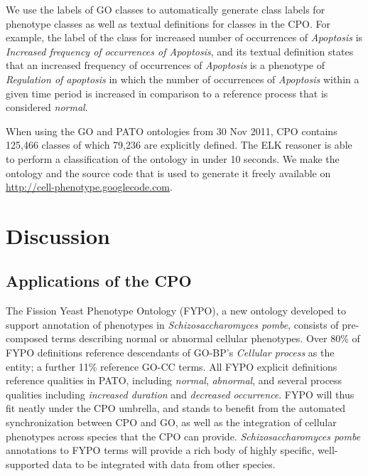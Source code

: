 \documentclass{bioinfo}
\renewcommand{\cite}{\citep}
\begin{document}
We use the labels of GO classes to automatically generate class labels
for phenotype classes as well as textual definitions for classes in
the CPO. For example, the label of the class for increased number of
occurrences of {\em Apoptosis} is {\em Increased frequency of
  occurrences of Apoptosis}, and its textual definition states that an
increased frequency of occurrences of {\em Apoptosis} is a phenotype
of {\em Regulation of apoptosis} in which the number of occurrences of
{\em Apoptosis} within a given time period is increased in comparison
to a reference process that is considered {\em normal}.

When using the GO and PATO ontologies from 30 Nov 2011, CPO contains
125,466 classes of which 79,236 are explicitly defined.  The ELK
reasoner \cite{Kazakov2011} is able to perform a classification of the
ontology in under 10 seconds. We make the ontology and the source code
that is used to generate it freely available on
\url{http://cell-phenotype.googlecode.com}.

\section{Discussion}

\subsection{Applications of the CPO}
The Fission Yeast Phenotype Ontology (FYPO), a new ontology developed
to support annotation of phenotypes in {\em Schizosaccharomyces
  pombe}, consists of pre-composed terms describing normal or abnormal
cellular phenotypes. Over 80\% of FYPO definitions reference
descendants of GO-BP's {\em Cellular process} as the entity; a further
11\% reference GO-CC terms. All FYPO explicit definitions reference
qualities in PATO, including {\em normal}, {\em abnormal}, and several
process qualities including {\em increased duration} and {\em
  decreased occurrence}. FYPO will thus fit neatly under the CPO
umbrella, and stands to benefit from the automated synchronization
between CPO and GO, as well as the integration of cellular phenotypes
across species that the CPO can provide. {\em Schizosaccharomyces
  pombe} annotations to FYPO terms will provide a rich body of highly
specific, well-supported data to be integrated with data from other
species.

\end{document}
